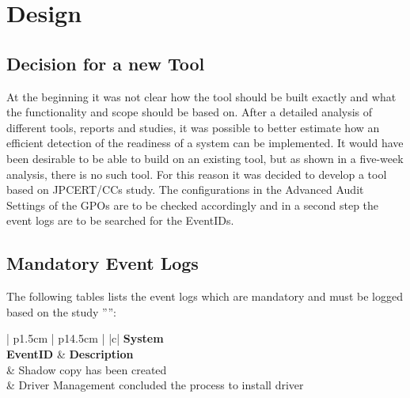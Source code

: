 \section{Design}
\subsection{Decision for a new Tool}
At the beginning it was not clear how the tool should be built exactly and what the functionality and scope should be based on. After a detailed analysis of different tools, reports and studies, it was possible to better estimate how an efficient detection of the readiness of a system can be implemented. It would have been desirable to be able to build on an existing tool, but as shown in a five-week analysis, there is no such tool. For this reason it was decided to develop a tool based on JPCERT/CCs study. The configurations in the Advanced Audit Settings of the GPOs are to be checked accordingly and in a second step the event logs are to be searched for the EventIDs.

\subsection{Mandatory Event Logs}\label{MandatoryLogs}
The following tables lists the event logs which are mandatory and must be logged based on the study '''':
\
\vspace{0.5cm}
\begin{table}[H]
    \centering
    \begin{tabular}{| p{1.5cm} | p{14.5cm} |} \hline
         {|c|} {\tiny\bfseries System} \\ \hline
        \textbf{EventID} & \textbf{Description}  \\ \footnotemark[1] & Shadow copy has been created \\ \hline
        20001\footnotemark[1] & Driver Management concluded the process to install driver  \\ \hline
    \end{tabular}
    \caption{Mandatory System Event Logs}
\end{table}


